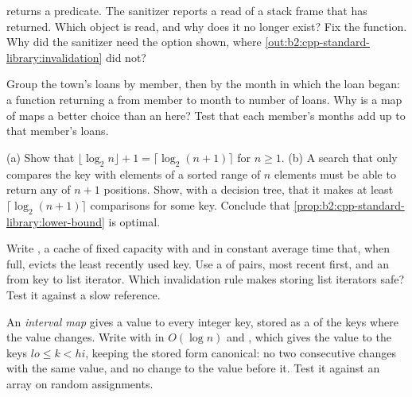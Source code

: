 \begin{exercise}[$\star\star$]\label{exo:b2:cpp-standard-library:6}
 returns a predicate. The sanitizer reports a read of a stack frame that has returned.
Which object is read, and why does it no longer exist? Fix the function. Why did the sanitizer need the option
shown, where \cref{out:b2:cpp-standard-library:invalidation} did not?
\end{exercise}

\begin{exercise}[$\star\star$]\label{exo:b2:cpp-standard-library:7}
Group the town's loans by member, then by the month in which the loan began: a function returning a
 from member to month to number of loans. Why is a map of maps a better
choice than an  here? Test that each member's months add up to that member's loans.
\end{exercise}

\begin{exercise}[$\star\star$]\label{exo:b2:cpp-standard-library:8}
(a) Show that $\lfloor \log_2 n \rfloor + 1 = \lceil \log_2 (n + 1) \rceil$ for $n \geq 1$. (b) A search that only
compares the key with elements of a sorted range of $n$ elements must be able to return any of $n + 1$ positions.
Show, with a decision tree, that it makes at least $\lceil \log_2 (n + 1) \rceil$ comparisons for some key. Conclude
that \cref{prop:b2:cpp-standard-library:lower-bound} is optimal.
\end{exercise}

\begin{exercise}[$\star\star$]\label{exo:b2:cpp-standard-library:9}
Write , a cache of fixed capacity with  and  in constant average time that,
when full, evicts the least recently used key. Use a  of pairs, most recent first, and an
 from key to list iterator. Which invalidation rule makes storing list iterators safe? Test it
against a slow reference.
\end{exercise}

\begin{exercise}[$\star\star\star$]\label{exo:b2:cpp-standard-library:10}
An \emph{interval map} gives a value to every integer key, stored as a  of the keys where the value
changes. Write  with  in $O(\log n)$ and , which gives
the value  to the keys $lo \leq k < hi$, keeping the stored form canonical: no two consecutive changes with
the same value, and no change to the value before it. Test it against an array on random assignments.
\end{exercise}


